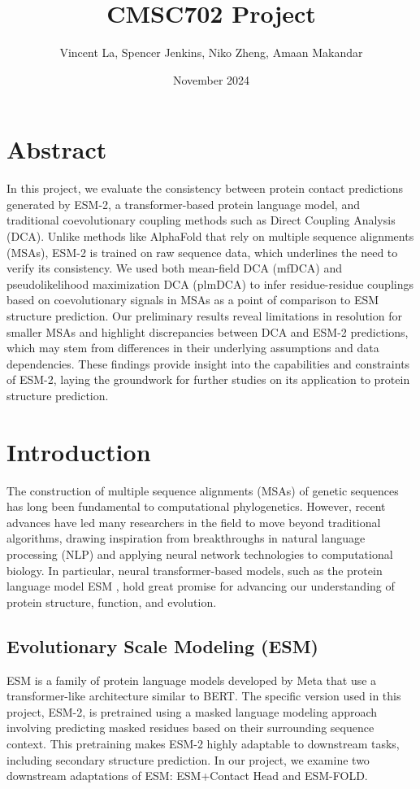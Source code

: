 \documentclass{article}
\title{CMSC702 Project}
\author{Vincent La, Spencer Jenkins, Niko Zheng, Amaan Makandar}
\date{November 2024}
\begin{document}
\maketitle

\section{Abstract}

In this project, we evaluate the consistency between protein contact predictions generated by ESM-2, a transformer-based protein language model, and traditional coevolutionary coupling methods such as Direct Coupling Analysis (DCA). Unlike methods like AlphaFold that rely on multiple sequence alignments (MSAs), ESM-2 is trained on raw sequence data, which underlines the need to verify its consistency. We used both mean-field DCA (mfDCA) and pseudolikelihood maximization DCA (plmDCA) to infer residue-residue couplings based on coevolutionary signals in MSAs as a point of comparison to ESM structure prediction. Our preliminary results reveal limitations in resolution for smaller MSAs and highlight discrepancies between DCA and ESM-2 predictions, which may stem from differences in their underlying assumptions and data dependencies. These findings provide insight into the capabilities and constraints of ESM-2, laying the groundwork for further studies on its application to protein structure prediction.


\section{Introduction}

The construction of multiple sequence alignments (MSAs) of genetic sequences has long been fundamental to computational phylogenetics. However, recent advances have led many researchers in the field to move beyond traditional algorithms, drawing inspiration from breakthroughs in natural language processing (NLP) and applying neural network technologies to computational biology. In particular, neural transformer-based models, such as the protein language model ESM \cite{ESM-FOLD}, hold great promise for advancing our understanding of protein structure, function, and evolution.

\subsection{Evolutionary Scale Modeling (ESM)}
ESM is a family of protein language models developed by Meta that use a transformer-like architecture similar to BERT. The specific version used in this project, ESM-2, is pretrained using a masked language modeling approach involving predicting masked residues based on their surrounding sequence context. This pretraining makes ESM-2 highly adaptable to downstream tasks, including secondary structure prediction. In our project, we examine two downstream adaptations of ESM: ESM+Contact Head and ESM-FOLD.
\end{document}
